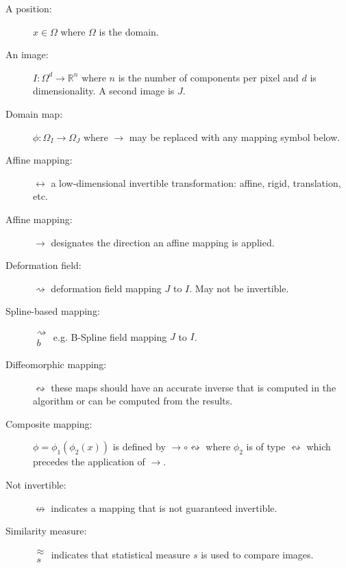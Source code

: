\documentclass{llncs}
\begin{document}
\begin{description}
\item [A position:] $x \in \Omega$ where $\Omega$ is the domain. 
\item [An image:]  $ I \colon \Omega^d \to \mathbb{R}^n$ where $n$ is the
  number of components per pixel and $d$ is dimensionality.  A second
  image is $J$. 
\item [Domain map:] $ \phi \colon \Omega_I \to \Omega_J $ where $\to$ may be
  replaced with any mapping symbol below. 
\item [Affine mapping:] $\leftrightarrow$ a low-dimensional invertible 
  transformation: affine, rigid, translation, etc. 
\item [Affine mapping:] $\rightarrow$ designates the direction an
  affine mapping is applied.  
\item [Deformation field:] $ \rightsquigarrow$ deformation field mapping $J$
  to $I$.  May not be invertible.
\item [Spline-based mapping:] $\substack{
   \rightsquigarrow \\
   b
  }$ e.g. B-Spline field mapping $J$
  to $I$.
\item [Diffeomorphic mapping:] $ \leftrightsquigarrow$ these maps
  should have an accurate inverse that is computed in the algorithm or can be computed from the results.
\item [Composite mapping:] $\phi=\phi_1(\phi_2(x))$ is defined by
  $\rightarrow \circ \leftrightsquigarrow$ where $\phi_2$ is of type $\leftrightsquigarrow$ which precedes the application of $\rightarrow$.
\item[Not invertible:]  $\nleftrightarrow$ indicates a mapping that is
  not guaranteed invertible.
\item [Similarity measure:] $\substack{
   \approx \\
   s
  }$ indicates that statistical measure $s$ is used to compare images.
\end{description}
\end{document}

